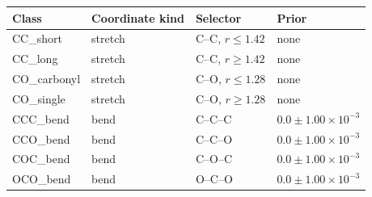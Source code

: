 \begin{tabular}{llll}
\toprule
Class & Coordinate kind & Selector & Prior \\
\midrule
CC\_short & stretch & C--C, $r\leq1.42$ & none \\
CC\_long & stretch & C--C, $r\geq1.42$ & none \\
CO\_carbonyl & stretch & C--O, $r\leq1.28$ & none \\
CO\_single & stretch & C--O, $r\geq1.28$ & none \\
CCC\_bend & bend & C--C--C & $0.0 \pm 1.00\times 10^{-3}$ \\
CCO\_bend & bend & C--C--O & $0.0 \pm 1.00\times 10^{-3}$ \\
COC\_bend & bend & C--O--C & $0.0 \pm 1.00\times 10^{-3}$ \\
OCO\_bend & bend & O--C--O & $0.0 \pm 1.00\times 10^{-3}$ \\
\bottomrule
\end{tabular}
